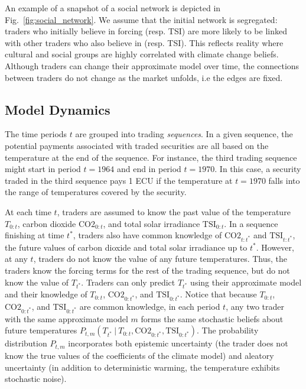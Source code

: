 \documentclass{wscpaperproc}\usepackage[]{graphicx}\usepackage[]{color}
\begin{document}
An example of a snapshot of a social network is depicted in Fig.~\ref{fig:social_network}. 
We assume that the initial network is segregated: traders who initially believe in  forcing (resp. TSI) are more likely to be linked with other traders who also believe in  (resp. TSI). 
This reflects reality where cultural and social groups are highly correlated with climate change beliefs. 
Although traders can change their approximate model over time, the connections between traders do not change as the market unfolds, i.e the edges are fixed.

\subsection{Model Dynamics}

The time periods $t$ are grouped into trading \emph{sequences\/}. 
In a given sequence, the potential payments associated with traded securities are all based on the temperature at the end of the sequence. 
For instance, the third trading sequence might start in period $t = 1964$ and end in period $t = 1970$. 
In this case, a security traded in the third sequence pays 1 ECU if the temperature at $t = 1970$ falls into the range of temperatures covered by the security. 

At each time $t$, traders are assumed to know the past value of the temperature ${T}_{0:t}$, carbon dioxide $\text{CO2}_{0:t}$, and total solar irradiance $\text{TSI}_{0:t}$. 
In a sequence finishing at time $t^*$, traders also have common knowledge of $\text{CO2}_{t:t^*}$ and $\text{TSI}_{t:t^*}$, the future values of carbon dioxide and total solar irradiance up to $t^*$.
However, at any $t$, traders do not know the value of any future temperatures. 
Thus, the traders know the forcing terms for the rest of the trading sequence, but do not know the value of ${T}_{t^*}$. 
Traders can only predict ${T}_{t^*}$ using their approximate model and their knowledge of ${T}_{0:t}$, $\text{CO2}_{0:t^*}$, and $\text{TSI}_{0:t^*}$.
Notice that because ${T}_{0:t}$, $\text{CO2}_{0:t^*}$, and $\text{TSI}_{0:t^*}$ are common knowledge, in each period $t$, any two trader with the same approximate model $m$ forms the same stochastic beliefs about future temperatures $P_{t,m}({T}_{t^*} ~|~ {T}_{0:t}, \text{CO2}_{0:t^*}, \text{TSI}_{0:t^*})$.
The probability distribution $P_{t,m}$ incorporates both epistemic uncertainty (the trader does not know the true values of the coefficients of the climate model) and aleatory uncertainty (in addition to deterministic warming, the temperature exhibits stochastic noise).
     
\end{document}
